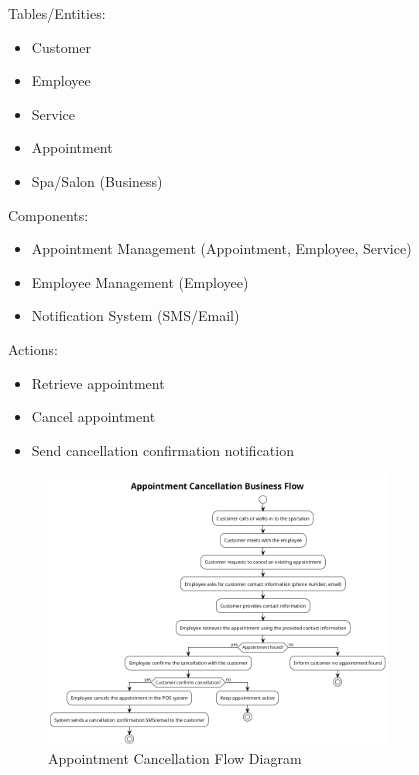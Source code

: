 \documentclass[]{VUMIFTemplateClass}
\begin{document}
Tables/Entities:
\begin{itemize}
    \setlength{\itemsep}{2pt}
    \setlength{\parskip}{0pt}
    \setlength{\parsep}{0pt}
    \item Customer
    \item Employee
    \item Service
    \item Appointment
    \item Spa/Salon (Business)
\end{itemize}

Components:
\begin{itemize}
    \setlength{\itemsep}{2pt}
    \setlength{\parskip}{0pt}
    \setlength{\parsep}{0pt}
    \item Appointment Management (Appointment, Employee, Service)
    \item Employee Management (Employee)
    \item Notification System (SMS/Email)
\end{itemize}

Actions:
\begin{itemize}
    \setlength{\itemsep}{2pt}
    \setlength{\parskip}{0pt}
    \setlength{\parsep}{0pt}
    \item Retrieve appointment
    \item Cancel appointment
    \item Send cancellation confirmation notification
\end{itemize}

\begin{figure}[H]
    \centering
    \includegraphics[width=0.8\textwidth]{images/diagrams/services/appointment_cancellation_flow.png}
    \caption{Appointment Cancellation Flow Diagram}
    \label{fig:appointment_cancellation_flow}
\end{figure}
\end{document}
